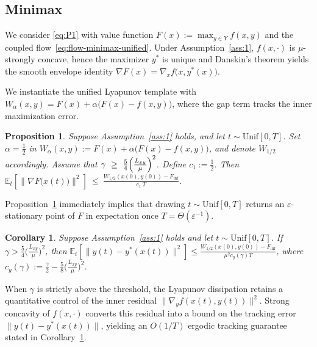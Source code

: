 \documentclass{article}
\newtheorem{proposition}[theorem]{Proposition}
\newtheorem{corollary}[theorem]{Corollary}
\newcommand{\1}{\mathbf{1}}
\begin{document}
\subsection{Minimax}\label{subsec:main-minimax}
We consider \ref{eq:P1} with value function $F(x):=\max_{y\in Y} f(x,y)$ and the coupled flow~\eqref{eq:flow-minimax-unified}.
Under Assumption~\ref{ass:1}, $f(x,\cdot)$ is $\mu$-strongly concave, hence the maximizer $y^*$ is unique and
Danskin's theorem yields the smooth envelope identity $\nabla F(x)=\nabla_x f\bigl(x,y^*(x)\bigr)$.

We instantiate the unified Lyapunov template with
$W_\alpha(x,y)=F(x)+\alpha\bigl(F(x)-f(x,y)\bigr)$, where the gap term tracks the inner maximization error.

\begin{proposition}\label{prop:minimax-ergodic}
Suppose Assumption~\ref{ass:1} holds, and let $t\sim\mathrm{Unif}[0,T]$.
Set $\alpha=\tfrac12$ in $W_\alpha(x,y):=F(x)+\alpha\bigl(F(x)-f(x,y)\bigr)$, and denote $W_{1/2}$ accordingly.
Assume that $\gamma\ \ge\ \frac{5}{4}\Bigl(\frac{L_{xy}}{\mu}\Bigr)^{2}$.
Define $c_1:=\tfrac12$.
Then $\mathbb{E}_{t}\!\left[\bigl\|\nabla F\bigl(x(t)\bigr)\bigr\|^{2}\right]
\ \le\ \frac{W_{1/2}(x(0),y(0)) - F_{\inf}}{c_1\,T}$.
\end{proposition}



\noindent
Proposition~\ref{prop:minimax-ergodic} immediately implies that drawing $t\sim\mathrm{Unif}[0,T]$
returns an $\varepsilon$-stationary point of $F$ in expectation once $T=\Theta(\varepsilon^{-1})$. 
\begin{corollary}\label{cor:minimax-tracking}
Suppose Assumption~\ref{ass:1} holds and let $t\sim\mathrm{Unif}[0,T]$.
If $\gamma>\frac{5}{4}\bigl(\frac{L_{xy}}{\mu}\bigr)^2$, then
$\mathbb E_t[\|y(t)-y^*(x(t))\|^{2}]
\le
\frac{W_{1/2}(x(0),y(0))-F_{\inf}}{\mu^{2}c_y(\gamma)T}$,
where $c_y(\gamma):=\frac{\gamma}{2}-\frac{5}{8}\bigl(\frac{L_{xy}}{\mu}\bigr)^2$.
\end{corollary}
When $\gamma$ is strictly above the threshold, the Lyapunov dissipation retains a quantitative control of the inner residual
$\|\nabla_y f(x(t),y(t))\|^2$.
Strong concavity of $f(x,\cdot)$ converts this residual into a bound on the tracking error $\|y(t)-y^*(x(t))\|$,
yielding an $O(1/T)$ ergodic tracking guarantee stated in Corollary~\ref{cor:minimax-tracking}.
\end{document}
